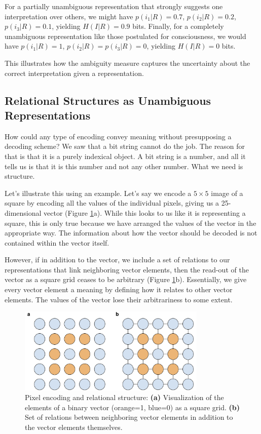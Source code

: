 \documentclass[11pt]{article}
\begin{document}
For a partially unambiguous representation that strongly suggests one interpretation over others, we might have $p(i_1|R) = 0.7$, $p(i_2|R) = 0.2$, $p(i_3|R) = 0.1$, yielding $H(I|R) = 0.9$ bits. Finally, for a completely unambiguous representation like those postulated for consciousness, we would have $p(i_1|R) = 1$, $p(i_2|R) = p(i_3|R) = 0$, yielding $H(I|R) = 0$ bits.

This illustrates how the ambiguity measure captures the uncertainty about the correct interpretation given a representation.

\subsection{Relational Structures as Unambiguous Representations}

How could any type of encoding convey meaning without presupposing a decoding scheme? We saw that a bit string cannot do the job. The reason for that is that it is a purely indexical object. A bit string is a number, and all it tells us is that it is this number and not any other number. What we need is structure.

Let's illustrate this using an example. Let's say we encode a $5 \times 5$ image of a square by encoding all the values of the individual pixels, giving us a 25-dimensional vector (Figure \ref{fig:pixel-encoding}a). While this looks to us like it is representing a square, this is only true because we have arranged the values of the vector in the appropriate way. The information about how the vector should be decoded is not contained within the vector itself.

However, if in addition to the vector, we include a set of relations to our representations that link neighboring vector elements, then the read-out of the vector as a square grid ceases to be arbitrary (Figure \ref{fig:pixel-encoding}b). Essentially, we give every vector element a meaning by defining how it relates to other vector elements. The values of the vector lose their arbitrariness to some extent.

\begin{figure}[htbp]
\centering
\includegraphics[width=0.8\textwidth]{figures/pixel-encoding-relational-structure.png}
\caption{Pixel encoding and relational structure: \textbf{(a)} Visualization of the elements of a binary vector (orange=1, blue=0) as a square grid. \textbf{(b)} Set of relations between neighboring vector elements in addition to the vector elements themselves.}
\label{fig:pixel-encoding}
\end{figure}
\end{document}
